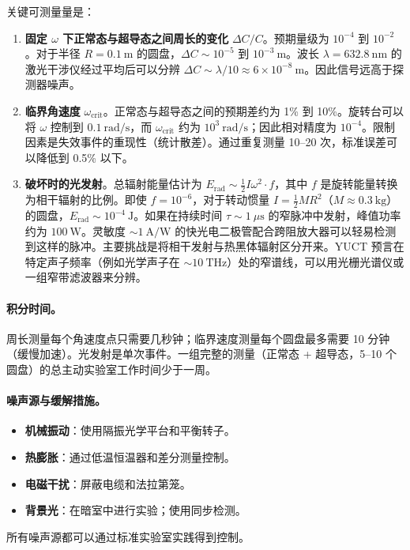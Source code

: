 \documentclass[12pt,a4paper]{article}
\begin{document}
	关键可测量量是：
	\begin{enumerate}
		\item \textbf{固定 \(\omega\) 下正常态与超导态之间周长的变化} \(\Delta C/C\)。预期量级为 \(10^{-4}\) 到 \(10^{-2}\)。对于半径 \(R = 0.1\ \text{m}\) 的圆盘，\(\Delta C \sim 10^{-5}\) 到 \(10^{-3}\ \text{m}\)。波长 \(\lambda = 632.8\ \text{nm}\) 的激光干涉仪经过平均后可以分辨 \(\Delta C \sim \lambda/10 \approx 6\times10^{-8}\ \text{m}\)。因此信号远高于探测器噪声。
		
		\item \textbf{临界角速度} \(\omega_{\text{crit}}\)。正常态与超导态之间的预期差约为 1\% 到 10\%。旋转台可以将 \(\omega\) 控制到 \(0.1\ \text{rad/s}\)，而 \(\omega_{\text{crit}}\) 约为 \(10^3\ \text{rad/s}\)；因此相对精度为 \(10^{-4}\)。限制因素是失效事件的重现性（统计散差）。通过重复测量 10–20 次，标准误差可以降低到 0.5\% 以下。
		
		\item \textbf{破坏时的光发射}。总辐射能量估计为 \(E_{\text{rad}} \sim \frac{1}{2} I \omega^2 \cdot f\)，其中 \(f\) 是旋转能量转换为相干辐射的比例。即使 \(f = 10^{-6}\)，对于转动惯量 \(I = \frac{1}{2} M R^2\)（\(M \approx 0.3\ \text{kg}\)）的圆盘，\(E_{\text{rad}} \sim 10^{-4}\ \text{J}\)。如果在持续时间 \(\tau \sim 1\ \mu\text{s}\) 的窄脉冲中发射，峰值功率约为 \(100\ \text{W}\)。灵敏度 \(\sim 1\ \text{A/W}\) 的快光电二极管配合跨阻放大器可以轻易检测到这样的脉冲。主要挑战是将相干发射与热黑体辐射区分开来。YUCT 预言在特定声子频率（例如光学声子在 \(\sim 10\ \text{THz}\)）处的窄谱线，可以用光栅光谱仪或一组窄带滤波器来分辨。
	\end{enumerate}
	
	\paragraph{积分时间。}
	周长测量每个角速度点只需要几秒钟；临界速度测量每个圆盘最多需要 10 分钟（缓慢加速）。光发射是单次事件。一组完整的测量（正常态 + 超导态，5–10 个圆盘）的总主动实验室工作时间少于一周。
	
	\paragraph{噪声源与缓解措施。}
	\begin{itemize}
		\item \textbf{机械振动}：使用隔振光学平台和平衡转子。
		\item \textbf{热膨胀}：通过低温恒温器和差分测量控制。
		\item \textbf{电磁干扰}：屏蔽电缆和法拉第笼。
		\item \textbf{背景光}：在暗室中进行实验；使用同步检测。
	\end{itemize}
	所有噪声源都可以通过标准实验室实践得到控制。
	
\end{document}
